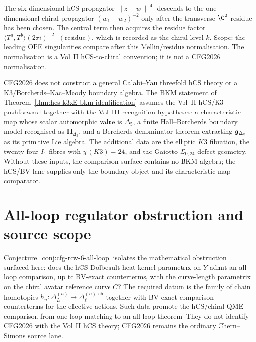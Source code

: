 \begin{remark}
\label{rem:cfg-imperfect-row-13}
The six-dimensional hCS propagator $\|z-w\|^{-4}$ descends to the
one-dimensional chiral propagator $(w_1-w_2)^{-2}$ only after the
transverse $\C^2$ residue has been chosen. The central term then
acquires the residue factor
$\langle T^a,T^b\rangle(2\pi i)^{-2}\cdot(\mathrm{residue})$, which is
recorded as the chiral level $k$. Scope: the leading OPE singularities
compare after this Mellin/residue normalisation. The normalisation is a
Vol~II hCS-to-chiral convention; it is not a CFG2026 normalisation.
\end{remark}

\begin{remark}
\label{rem:cfg-imperfect-row-14}
CFG2026 does not construct a general Calabi--Yau threefold hCS theory
or a K3/Borcherds--Kac--Moody boundary algebra. The BKM statement of
Theorem~\ref{thm:hcs-k3xE-bkm-identification} assumes the Vol~II
hCS/K3 pushforward together with the Vol~III recognition hypotheses:
a characteristic map whose scalar automorphic value is $\Delta_5$, a
finite Hall--Borcherds boundary model recognised as
$\mathbf H_{\Delta_5}$, and a Borcherds denominator theorem extracting
$\mathfrak{g}_{\Delta_5}$ as its primitive Lie algebra.
The additional data are the elliptic $K3$ fibration, the
twenty-four $I_1$ fibres with $\chi(K3)=24$, and the Gaiotto
$\Sigma_{0,24}$ defect geometry. Without these inputs, the comparison
surface contains no BKM algebra; the hCS/BV lane supplies only the
boundary object and its characteristic-map comparator.
\end{remark}

\section{All-loop regulator obstruction and source scope}
\label{sec:cfg-regulator-obstruction}

\begin{remark}
\label{rem:cfg-regulator-obstruction}
Conjecture~\ref{conj:cfg-row-6-all-loop} isolates the mathematical
obstruction surfaced here: does the hCS Dolbeault heat-kernel parametrix
on $Y$ admit an all-loop comparison, up to BV-exact counterterms, with
the curve-length parametrix on the chiral avatar reference curve $C$?
The required datum is the family of chain homotopies
$h_n\colon\Delta_L^{(n)}\to\Delta_\ell^{(n),\mathrm{ch}}$ together
with BV-exact comparison counterterms for the effective actions. Such
data promote the hCS/chiral QME comparison from one-loop matching to an
all-loop theorem. They do not identify CFG2026 with the Vol~II hCS
theory; CFG2026 remains the ordinary Chern--Simons source lane.
\end{remark}

